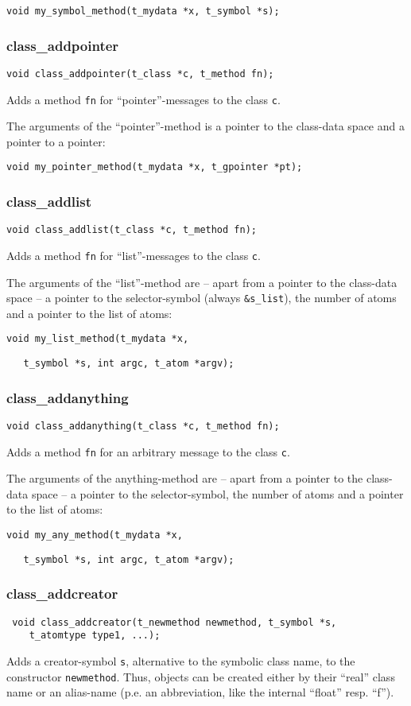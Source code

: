 \documentclass[12pt, a4paper,english,titlepage]{article}
\begin{document}
\begin{appendix}
\verb+void my_symbol_method(t_mydata *x, t_symbol *s);+

\subsubsection{class\_addpointer}
\begin{verbatim}
void class_addpointer(t_class *c, t_method fn);
\end{verbatim}
Adds a method \verb+fn+ for ``pointer''-messages to the class \verb+c+.

The arguments of the ``pointer''-method is a pointer to the class-data space and
a pointer to a pointer:

\verb+void my_pointer_method(t_mydata *x, t_gpointer *pt);+

\subsubsection{class\_addlist}
\begin{verbatim}
void class_addlist(t_class *c, t_method fn);
\end{verbatim}
Adds a method \verb+fn+ for ``list''-messages to the class \verb+c+.

The arguments of the ``list''-method are -- apart from a pointer to the class-data space --
a pointer to the selector-symbol (always \verb+&s_list+),
the number of atoms and a pointer to the list of atoms:

\verb+void my_list_method(t_mydata *x,+

\verb+   t_symbol *s, int argc, t_atom *argv);+

\subsubsection{class\_addanything}
\begin{verbatim}
void class_addanything(t_class *c, t_method fn);
\end{verbatim}
Adds a method \verb+fn+ for an arbitrary message to the class \verb+c+.

The arguments of the anything-method are -- apart from a pointer to the class-data space --
a pointer to the selector-symbol,
the number of atoms and a pointer to the list of atoms:

\verb+void my_any_method(t_mydata *x,+

\verb+   t_symbol *s, int argc, t_atom *argv);+

\subsubsection{class\_addcreator}
\begin{verbatim}
 void class_addcreator(t_newmethod newmethod, t_symbol *s, 
    t_atomtype type1, ...);
\end{verbatim}
Adds a creator-symbol \verb+s+, alternative to the symbolic class name,
to the constructor \verb+newmethod+.
Thus, objects can be created either by their ``real'' class name or
an alias-name (p.e. an abbreviation, like the internal ``float'' resp. ``f'').


\end{appendix}
\end{document}
